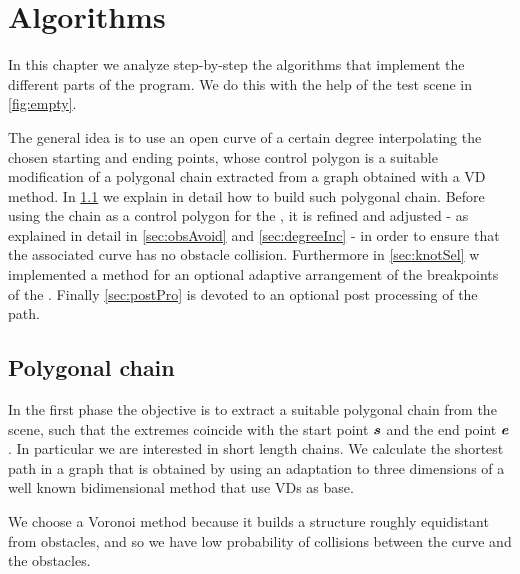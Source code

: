 \documentclass[dissertation.tex]{subfiles}
\begin{document}
\chapter{Algorithms}\label{cha:algorithm}
In this chapter we analyze step-by-step the algorithms that implement
the different parts of the program. We do this with the help of the
test scene in \cref{fig:empty}.

The general idea is to use an open \bs curve of a certain degree
interpolating the chosen starting and ending points, whose
control polygon is a suitable modification of a polygonal chain
extracted from a graph
obtained with a \ac{VD} method. In \cref{sec:polChain} we
explain in detail how to
build such polygonal chain. Before using the chain as a control
polygon for the \bs, it is refined and adjusted - as explained in
detail in \cref{sec:obsAvoid} and \cref{sec:degreeInc} - in order to
ensure that the associated \bs curve has no obstacle
collision. Furthermore in \cref{sec:knotSel} w implemented a method
for an optional adaptive 
arrangement of the breakpoints of the \bs. Finally \cref{sec:postPro}
is devoted to an optional post processing of the path.

\section{Polygonal chain}\label{sec:polChain}
In the first phase the objective is to extract a suitable polygonal chain from
the scene, such that the extremes coincide with the start point $\boldsymbol{s}$
and the end point $\boldsymbol{e}$. In particular we are interested in short length
chains. We calculate the shortest path
in a graph that is obtained by using an adaptation to three
dimensions of a well known bidimensional method
\cite{bhattacharya}\cite{ho-liu}\cite{seda-pich} that use
\acp{VD} as base.

We choose a Voronoi method because it builds a structure roughly
equidistant from obstacles, and so we have low probability of
collisions between the curve and the obstacles.
\end{document}
